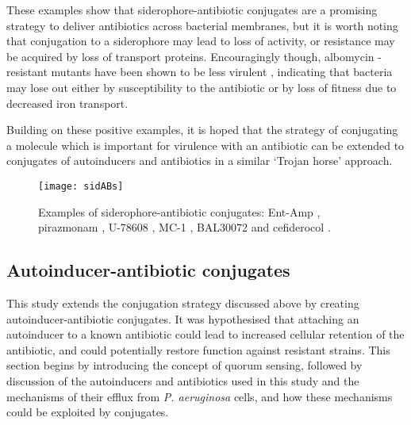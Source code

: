 These examples show that siderophore-antibiotic conjugates are a promising strategy to deliver antibiotics across bacterial membranes, but it is worth noting that conjugation to a siderophore may lead to loss of activity, or resistance may be acquired by loss of transport proteins. Encouragingly though, albomycin -resistant mutants have been shown to be less virulent \cite{Pramanik2007}, indicating that bacteria may lose out either by susceptibility to the antibiotic or by loss of fitness due to decreased iron transport. 

Building on these positive examples, it is hoped that the strategy of conjugating a molecule which is important for virulence\cite{Vasil1999} with an antibiotic can be extended to conjugates of autoinducers and antibiotics in a similar `Trojan horse' approach.

\begin{figure}[H]
	\begin{center}
		\texttt{[image: sidABs]}
		\caption{Examples of siderophore-antibiotic conjugates: Ent-Amp \cite{Zheng2014}, 
		pirazmonam \cite{Zurenko1990,Harrington2012}, 
		U-78608 ,\cite{Zurenko1990,Harrington2012} 
		MC-1 \cite{McPherson2012},  
		BAL30072 \cite{Page2013}
		and cefiderocol \cite{Ito2018,Saisho2018}.
		\label{fgr:synthsidABs}}
	\end{center}
\end{figure}



\subsection{Autoinducer-antibiotic conjugates\label{sec:AIABs}}


This study extends the conjugation strategy discussed above by creating autoinducer-antibiotic conjugates. It was hypothesised that attaching an autoinducer to a known antibiotic could lead to increased cellular retention of the antibiotic, and could potentially restore function against resistant strains.
This section begins by introducing the concept of quorum sensing, followed by discussion of the autoinducers and antibiotics used in this study and the mechanisms of their efflux from \textit{P. aeruginosa} cells, and how these mechanisms could be exploited by conjugates.


